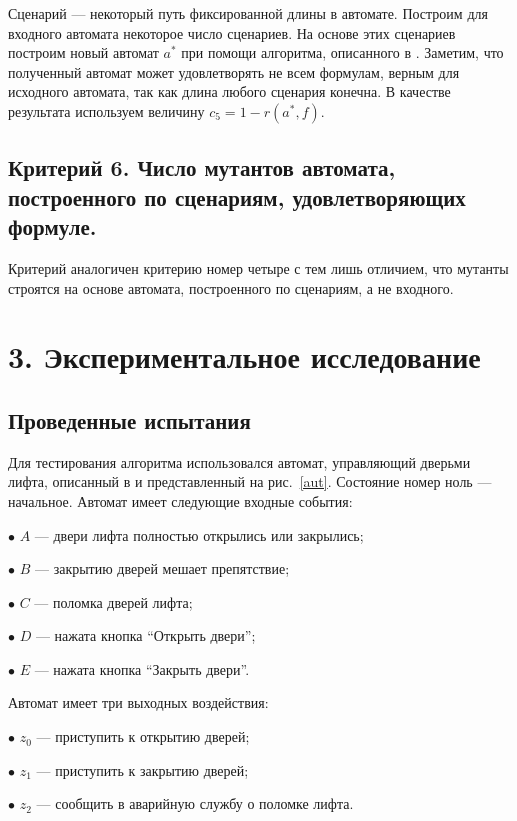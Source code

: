 \documentclass[12pt,fleqn]{article}
\begin{document}
Сценарий --- некоторый путь фиксированной длины в автомате. Построим для входного автомата некоторое
число сценариев. На основе этих сценариев построим новый автомат $a^*$ при помощи алгоритма, описанного в \cite{eg}.
Заметим, что полученный автомат может удовлетворять не всем формулам, верным для исходного автомата, так как
длина любого сценария конечна. В качестве результата используем величину $c_5 = 1 - r(a^*, f)$.

\subsection{Критерий 6. Число мутантов автомата, построенного по сценариям, удовлетворяющих формуле.}

Критерий аналогичен критерию номер четыре с тем лишь отличием, что мутанты строятся на основе автомата, построенного по
сценариям, а не входного.

\section{3. Экспериментальное исследование}

\subsection{Проведенные испытания}

Для тестирования алгоритма использовался автомат, управляющий дверьми лифта, описанный в \cite[Sec 2.3.1]{eg}
и представленный на рис.~\ref{aut}. Состояние номер ноль --- начальное. Автомат имеет следующие входные события:

$\bullet$ $A$ --- двери лифта полностью открылись или закрылись;

$\bullet$ $B$ --- закрытию дверей мешает препятствие;

$\bullet$ $C$ --- поломка дверей лифта;

$\bullet$ $D$ --- нажата кнопка ``Открыть двери'';

$\bullet$ $E$ --- нажата кнопка ``Закрыть двери''.

Автомат имеет три выходных воздействия:

$\bullet$ $z_0$ --- приступить к открытию дверей;

$\bullet$ $z_1$ --- приступить к закрытию дверей;

$\bullet$ $z_2$ --- сообщить в аварийную службу о поломке лифта.
\end{document}

